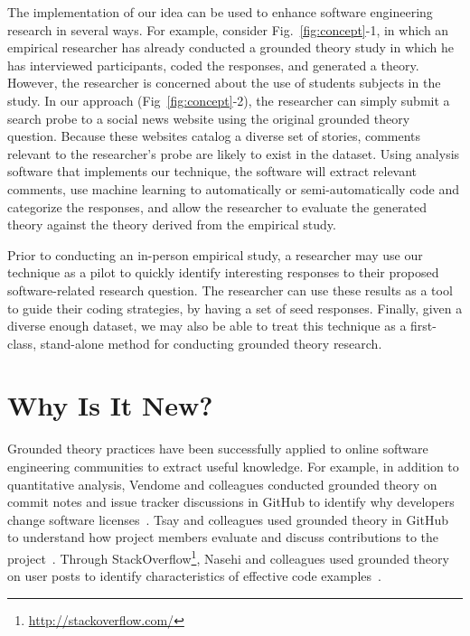 \documentclass{sig-alternate}
\begin{document}
The implementation of our idea can be used to enhance software engineering research in several ways.  For example, consider Fig.~\ref{fig:concept}-1, in which an empirical researcher has already conducted a grounded theory study in which he has interviewed participants, coded the responses, and generated a theory. However, the researcher is concerned about the use of students subjects in the study. In our approach (Fig~\ref{fig:concept}-2), the researcher can simply submit a search probe to a social news website using the original grounded theory question. Because these websites catalog a diverse set of stories, comments relevant to the researcher's probe are likely to exist in the dataset. Using analysis software that implements our technique, the software will extract relevant comments, use machine learning to automatically or semi-automatically code and categorize the responses, and allow the researcher to evaluate the generated theory against the theory derived from the empirical study.

Prior to conducting an in-person empirical study, a researcher may use our technique as a pilot to quickly identify interesting responses to their proposed software-related research question. The researcher can use these results as a tool to guide their coding strategies, by having a set of seed responses. Finally, given a diverse enough dataset, we may also be able to treat this technique as a first-class, stand-alone method for conducting grounded theory research.


\section{Why Is It New?}

Grounded theory practices have been successfully applied to online software engineering communities to extract useful knowledge.
For example, in addition to quantitative analysis, Vendome and colleagues conducted grounded theory on commit notes and issue tracker discussions in GitHub to identify why developers change software licenses~\cite{Vendome2015}. Tsay and colleagues used grounded theory in GitHub to understand how project members evaluate and discuss contributions to the project~\cite{Tsay2014}. Through StackOverflow\footnote{\url{http://stackoverflow.com/}}, Nasehi and colleagues used grounded theory on user posts to identify characteristics of effective code examples~\cite{Nasehi2012}.
\end{document}
